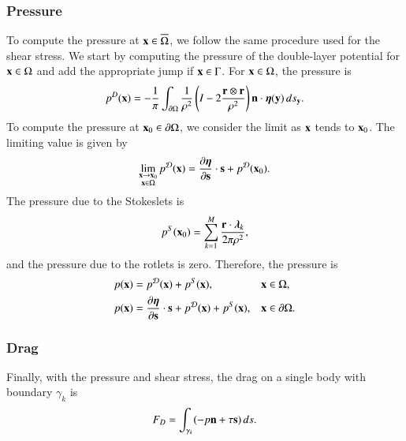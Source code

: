 \documentclass[preprint, 10pt]{elsarticle}
\begin{document}
\subsubsection{Pressure}
To compute the pressure at ${\mathbf{x}} \in \overline{\Omega}$, we follow the
same procedure used for the shear stress.  We start by computing the
pressure of the double-layer potential for ${\mathbf{x}} \in \Omega$ and add the
appropriate jump if ${\mathbf{x}} \in \Gamma$. For ${\mathbf{x}} \in \Omega$, the pressure
is
\begin{align}
  p^{D}({\mathbf{x}}) = -\frac{1}{\pi}\int_{{\partial}\Omega} \frac{1}{\rho^2}
    \left(I - 2 \frac{{\mathbf{r}} \otimes {\mathbf{r}}}{\rho^2}\right) 
    {\mathbf{n}} \cdot {\boldsymbol\eta}({\mathbf{y}}) \,ds_{\mathbf{y}}.
\end{align}
To compute the pressure at ${\mathbf{x}}_0 \in {\partial}\Omega$, we consider the limit
as ${\mathbf{x}}$ tends to ${\mathbf{x}}_0$.  The limiting value is given
by~\cite{qua-bir2014a}
\begin{align*}
  \lim_{\substack{{\mathbf{x}} \rightarrow {\mathbf{x}}_0 \\ {\mathbf{x}} \in \Omega}}p^{\mathcal{D}}({\mathbf{x}}) =  
    \frac{\partial {\boldsymbol\eta}}{\partial {\mathbf{s}}} \cdot {\mathbf{s}} + p^{{\mathcal{D}}}({\mathbf{x}}_0).
\end{align*}
The pressure due to the Stokeslets is
\begin{align*}
  p^S({\mathbf{x}}_0) = \sum_{k=1}^{M}\frac{{\mathbf{r}} \cdot {\boldsymbol\lambda}_k}{2\pi\rho^2},
\end{align*}
and the pressure due to the rotlets is zero.  Therefore, the pressure is
\begin{equation}
\label{eqn:pressureDLP}
\begin{aligned}
  p({\mathbf{x}}) &= p^{{\mathcal{D}}}({\mathbf{x}}) + p^{S}({\mathbf{x}}), \quad &&{\mathbf{x}} \in \Omega,\\
  p({\mathbf{x}}) &= \frac{\partial {\boldsymbol\eta}}{\partial {\mathbf{s}}} \cdot {\mathbf{s}} + p^{{\mathcal{D}}}({\mathbf{x}}) + 
              p^{S}({\mathbf{x}}), && {\mathbf{x}} \in {\partial}\Omega.
\end{aligned}
\end{equation}

\subsubsection{Drag}
Finally, with the pressure and shear stress, the drag on a single body
with boundary $\gamma_k$ is
\begin{align}
  F_D = \int_{\gamma_k} (-p {\mathbf{n}} + \tau {\mathbf{s}})\,ds.
  \label{eqn:drag}
\end{align}
\end{document}
